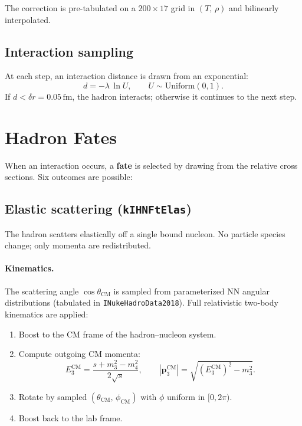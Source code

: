 \documentclass[11pt,a4paper]{article}
\newcommand{\vect}[1]{\bm{#1}}
\newcommand{\unit}[1]{\,\mathrm{#1}}
\newcommand{\fm}{\unit{fm}}
\begin{document}
The correction is pre-tabulated on a $200 \times 17$ grid in
$(T,\,\rho)$ and bilinearly interpolated.

\subsection{Interaction sampling}

At each step, an interaction distance is drawn from an exponential:
\begin{equation}
  d = -\lambda\,\ln U, \qquad U \sim \text{Uniform}(0,1).
\end{equation}
If $d < \delta r = 0.05\fm$, the hadron interacts; otherwise it
continues to the next step.

\section{Hadron Fates}
\label{sec:fates}

When an interaction occurs, a \textbf{fate} is selected by drawing from
the relative cross sections.  Six outcomes are possible:

\subsection{Elastic scattering (\texttt{kIHNFtElas})}

The hadron scatters elastically off a single bound nucleon.  No particle
species change; only momenta are redistributed.

\paragraph{Kinematics.}
The scattering angle $\cos\theta_{\text{CM}}$ is sampled from
parameterized NN angular distributions (tabulated in
\texttt{INukeHadroData2018}).  Full relativistic two-body kinematics are
applied:
\begin{enumerate}
  \item Boost to the CM frame of the hadron--nucleon system.
  \item Compute outgoing CM momenta:
        \begin{equation}
          E_{3}^{\text{CM}} = \frac{s + m_{3}^{2} - m_{4}^{2}}{2\sqrt{s}},
          \qquad
          |\vect{p}_{3}^{\text{CM}}| = \sqrt{(E_{3}^{\text{CM}})^{2} - m_{3}^{2}}.
        \end{equation}
  \item Rotate by sampled $(\theta_{\text{CM}},\,\phi_{\text{CM}})$ with
        $\phi$ uniform in $[0,2\pi)$.
  \item Boost back to the lab frame.
\end{enumerate}
\end{document}
